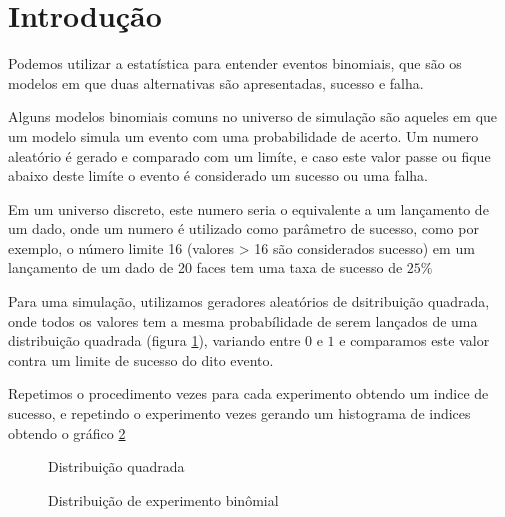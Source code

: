 \section{Introdu\c{c}\~{a}o}

Podemos utilizar a estat\'{i}stica para entender eventos binomiais, que s\~{a}o os modelos
em que duas alternativas s\~{a}o apresentadas, sucesso e falha.

Alguns modelos binomiais comuns no universo de simula\c{c}\~{a}o
s\~{a}o aqueles em que um modelo simula um evento com uma probabilidade de acerto.
Um numero aleat\'{o}rio \'{e} gerado
e comparado com um lim\'{i}te, e caso este valor passe ou
fique abaixo deste lim\'{i}te o evento \'{e} considerado um sucesso ou uma falha.

Em um universo discreto, este numero seria o equivalente a um lan\c{c}amento de um dado,
onde um numero \'{e} utilizado como par\^{a}metro de sucesso, como por exemplo, o n\'umero limite 16 (valores > 16
s\~ao considerados sucesso)
em um lan\c{c}amento de um dado de 20 faces tem uma taxa de sucesso de $25\%$

Para uma simula\c{c}\~{a}o, utilizamos geradores aleat\'{o}rios de dsitribui\c{c}\~{a}o quadrada, onde
todos os valores tem a mesma probabílidade de serem lan\c{c}ados
de uma distribui\c{c}\~{a}o quadrada (figura \ref{intro:squared}), variando entre $0$ e $1$
e comparamos este valor contra um limite de sucesso do dito evento.

Repetimos o procedimento \introexperimentsize{} vezes para cada experimento obtendo um indice de sucesso,
e repetindo o experimento \introexperimentrepeats{} vezes gerando um histograma de indices obtendo o gr\'{a}fico
\ref{intro:binomial}

\begin{center}
\begin{figure}[H]
\begin{center}
\caption{Distribui\c{c}\~ao quadrada}
\label{intro:squared}
\end{center}
\end{figure}
\end{center}

\begin{center}
\begin{figure}[H]
\begin{center}
\caption{Distribui\c{c}\~ao de experimento bin\^omial}
\label{intro:binomial}
\end{center}
\end{figure}
\end{center}
